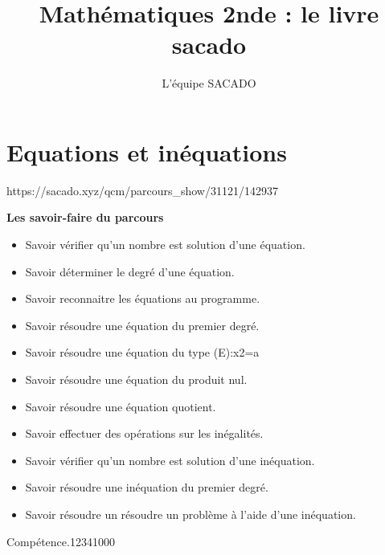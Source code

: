 



\title{Mathématiques 2nde  : le livre sacado}
\author{L'équipe SACADO}




\chapter{Equations et inéquations}
{https://sacado.xyz/qcm/parcours_show/31121/142937}
{
 \begin{CpsCol}
	\textbf{Les savoir-faire du parcours}
 	\begin{itemize}
 		\item Savoir vérifier qu'un nombre est solution d'une équation.
		\item Savoir déterminer le degré d'une équation.
		\item Savoir reconnaitre les équations au programme.
		\item Savoir résoudre une équation du premier degré.
		\item Savoir résoudre une équation du type (E):x2=a
		\item Savoir résoudre une équation du produit nul.
		\item Savoir résoudre une équation quotient. 
		\item Savoir effectuer des opérations sur les inégalités.
		\item Savoir vérifier qu'un nombre est solution d'une inéquation.
		\item Savoir résoudre une inéquation du premier degré.
		\item Savoir résoudre un résoudre un problème à l'aide d'une inéquation.
 	\end{itemize}
 \end{CpsCol}

\begin{His}
\end{His}

\begin{ExoDec}{Compétence.}{1234}{1}{0}{0}{0}
\end{ExoDec}
}


